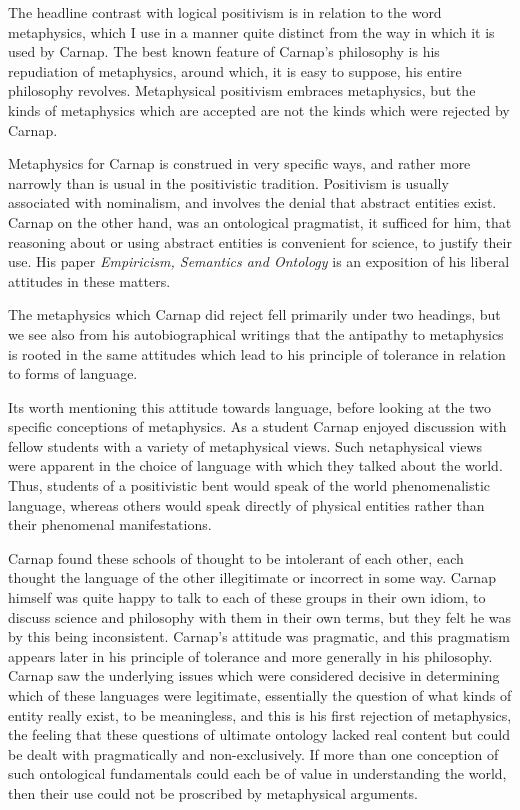 The headline contrast with logical positivism is in relation to the
word metaphysics, which I use in a manner quite distinct from the way
in which it is used by Carnap.
The best known feature of Carnap's philosophy is his repudiation of
metaphysics, around which, it is easy to suppose, his entire philosophy
revolves.
Metaphysical positivism embraces metaphysics, but the kinds of
metaphysics which are accepted are not the kinds which were rejected
by Carnap.

Metaphysics for Carnap is construed in very specific ways, and rather
more narrowly than is usual in the positivistic tradition.
Positivism is usually associated with nominalism, and involves the
denial that abstract entities exist.
Carnap on the other hand, was an ontological pragmatist, it sufficed
for him, that reasoning about or using abstract entities is convenient for science, to
justify their use.
His paper \emph{Empiricism, Semantics and Ontology} is an exposition
of his liberal attitudes in these matters.

The metaphysics which Carnap did reject fell primarily under two
headings, but we see also from his autobiographical writings that the
antipathy to metaphysics is rooted in the same attitudes which lead to
his principle of tolerance in relation to forms of language.

Its worth mentioning this attitude towards language, before looking at
the two specific conceptions of metaphysics.
As a student Carnap enjoyed discussion with fellow students with a
variety of metaphysical views.
Such netaphysical views were apparent in the choice of language with
which they talked about the world.
Thus, students of a positivistic bent would speak of the world
phenomenalistic language, whereas others would speak directly of
physical entities rather than their phenomenal manifestations.

Carnap found these schools of thought to be intolerant of each other,
each thought the language of the other illegitimate or incorrect in
some way.
Carnap himself was quite happy to talk to each of these groups in
their own idiom, to discuss science and philosophy with them in their
own terms, but they felt he was by this being inconsistent.
Carnap's attitude was pragmatic, and this pragmatism appears later in
his principle of tolerance and more generally in his philosophy.
Carnap saw the underlying issues which were considered decisive in
determining which of these languages were legitimate, essentially the
question of what kinds of entity really exist, to be meaningless, and
this is his first rejection of metaphysics, the feeling that these
questions of ultimate ontology lacked real content but could be dealt
with pragmatically and non-exclusively.
If more than one conception of such ontological fundamentals could
each be of value in understanding the world, then their use could not
be proscribed by metaphysical arguments.

